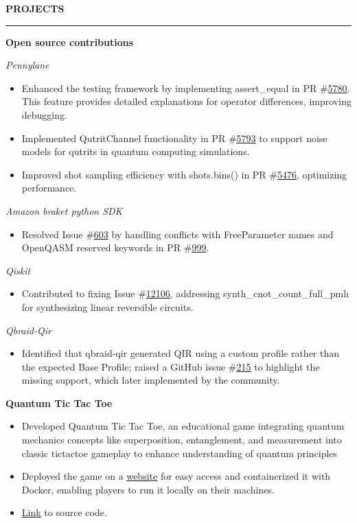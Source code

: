 \documentclass[a4paper,10pt]{article}
\let\oldhref\href
\renewcommand{\href}[2]{\oldhref{#1}{\uline{#2}}}
\newcommand{\cvHeaderOne}[1]{%
  \vspace*{1.5em}%
  {\noindent\large\textbf{\MakeUppercase{#1}}\par}%
  \noindent\rule{\linewidth}{0.4pt}%
  \vspace*{0.5em}%
}
\newcommand{\cvHeaderTwo}[2]{%
  \vspace{0.8em}%
  \noindent\textbf{\normalsize #1} \hfill \textit{#2}\par%
}
\newcommand{\cvHeaderThree}[1]{%
  \noindent\textit{#1}%
}
\newenvironment{cvItemList}{%
  \begin{itemize}%
    \setlength{\itemsep}{0.1em}%
    \setlength{\topsep}{0em}%
    \setlength{\partopsep}{0em}%
    \setlength{\parsep}{0em}%
    \setlength{\parskip}{0em}%
}{%
  \end{itemize}%
}
\begin{document}
\cvHeaderOne{Projects}

\cvHeaderTwo{Open source contributions}{}

\cvHeaderThree{Pennylane}
\begin{cvItemList}
\item Enhanced the testing framework by implementing assert\_equal in PR \#\href{https://github.com/PennyLaneAI/pennylane/pull/5780}{5780}. This feature provides detailed explanations for operator differences, improving debugging.
\item Implemented QutritChannel functionality in PR \#\href{https://github.com/PennyLaneAI/pennylane/pull/5793}{5793} to support noise models for qutrits in quantum computing simulations.
\item Improved shot sampling efficiency with shots.bins() in PR \#\href{https://github.com/PennyLaneAI/pennylane/pull/5476}{5476}, optimizing performance.
\end{cvItemList}

\cvHeaderThree{Amazon braket python SDK}
\begin{cvItemList}
\item Resolved Issue \#\href{https://github.com/amazon-braket/amazon-braket-sdk-python/issues/603}{603} by handling conflicts with FreeParameter names and OpenQASM reserved keywords in PR \#\href{https://github.com/amazon-braket/amazon-braket-sdk-python/pull/999}{999}. 
\end{cvItemList}

\cvHeaderThree{Qiskit}
\begin{cvItemList}
\item Contributed to fixing Issue \#\href{https://github.com/Qiskit/qiskit/issues/12106}{12106}, addressing synth\_cnot\_count\_full\_pmh for synthesizing linear reversible circuits.
\end{cvItemList}

\cvHeaderThree{Qbraid-Qir}
\begin{cvItemList}
\item Identified that qbraid-qir generated QIR using a custom profile rather than the expected Base Profile; raised a GitHub issue \#\href{https://github.com/qBraid/qbraid-qir/issues/215}{215} to highlight the missing support, which later implemented by the community. 
\end{cvItemList}

\newpage

\cvHeaderTwo{Quantum Tic Tac Toe}{}
\begin{cvItemList}
\item Developed Quantum Tic Tac Toe, an educational game integrating quantum mechanics concepts like superposition, entanglement, and measurement into classic tic\-tac\-toe gameplay to enhance understanding of quantum principles
\item Deployed the game on a \href{https://quantumtictactoe-ekm2cauxbumdelekkkaxqz.streamlit.app}{website} for easy access and containerized it with Docker, enabling players to run it locally on their machines.
\item \href{https://github.com/Tarun-Kumar07/QuantumTicTacToe}{Link} to source code.
\end{cvItemList}
\end{document}
